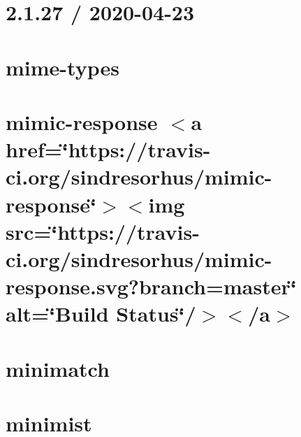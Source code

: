 \let\mypdfximage\pdfximage\def\pdfximage{\immediate\mypdfximage}\documentclass[twoside]{book}
\newcommand{\+}{\discretionary{\mbox{\scriptsize$\hookleftarrow$}}{}{}}
\begin{document}
\chapter{2.1.27 / 2020-\/04-\/23}
\label{md__c_1__git_hub__p_r_o_y_e_c_t_o-_i_i_i-_g_o_t_rest-api_node_modules_mime-types__h_i_s_t_o_r_y}

\chapter{mime-\/types}
\label{md__c_1__git_hub__p_r_o_y_e_c_t_o-_i_i_i-_g_o_t_rest-api_node_modules_mime-types__r_e_a_d_m_e}

\chapter{mimic-\/response $<$a href=\char`\"{}https\+://travis-\/ci.\+org/sindresorhus/mimic-\/response\char`\"{}$>$$<$img src=\char`\"{}https\+://travis-\/ci.\+org/sindresorhus/mimic-\/response.\+svg?branch=master\char`\"{} alt=\char`\"{}\+Build Status\char`\"{}/$>$$<$/a$>$}
\label{md__c_1__git_hub__p_r_o_y_e_c_t_o-_i_i_i-_g_o_t_rest-api_node_modules_mimic-response_readme}

\chapter{minimatch}
\label{md__c_1__git_hub__p_r_o_y_e_c_t_o-_i_i_i-_g_o_t_rest-api_node_modules_minimatch__r_e_a_d_m_e}

\chapter{minimist}
\label{md__c_1__git_hub__p_r_o_y_e_c_t_o-_i_i_i-_g_o_t_rest-api_node_modules_minimist_readme}

\end{document}
